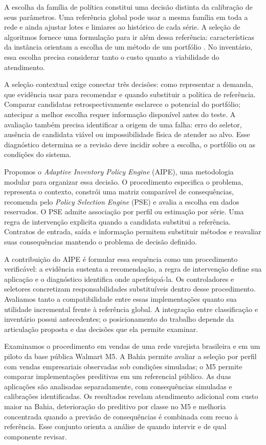 \documentclass[preprint,12pt]{elsarticle}
\begin{document}
A escolha da família de política constitui uma decisão distinta da calibração de seus parâmetros. Uma referência global pode usar a mesma família em toda a rede e ainda ajustar lotes e limiares ao histórico de cada série. A seleção de algoritmos fornece uma formulação para ir além dessa referência: características da instância orientam a escolha de um método de um portfólio \cite{rice1976,Kotthoff2014AlgorithmSelection}. No inventário, essa escolha precisa considerar tanto o custo quanto a viabilidade do atendimento.

A seleção contextual exige conectar três decisões: como representar a demanda, que evidência usar para recomendar e quando substituir a política de referência. Comparar candidatas retrospectivamente esclarece o potencial do portfólio; antecipar a melhor escolha requer informação disponível antes do teste. A avaliação também precisa identificar a origem de uma falha: erro do seletor, ausência de candidata viável ou impossibilidade física de atender ao alvo. Esse diagnóstico determina se a revisão deve incidir sobre a escolha, o portfólio ou as condições do sistema.

Propomos o \textit{Adaptive Inventory Policy Engine} (AIPE), uma metodologia modular para organizar essa decisão. O procedimento especifica o problema, representa o contexto, constrói uma matriz comparável de consequências, recomenda pelo \textit{Policy Selection Engine} (PSE) e avalia a escolha em dados reservados. O PSE admite associação por perfil ou estimação por série. Uma regra de intervenção explicita quando a candidata substitui a referência. Contratos de entrada, saída e informação permitem substituir métodos e reavaliar suas consequências mantendo o problema de decisão definido.

A contribuição do AIPE é formular essa sequência como um procedimento verificável: a evidência sustenta a recomendação, a regra de intervenção define sua aplicação e o diagnóstico identifica onde aperfeiçoá-la. Os controladores e seletores concretizam responsabilidades substituíveis dentro desse procedimento. Avaliamos tanto a compatibilidade entre essas implementações quanto sua utilidade incremental frente à referência global. A integração entre classificação e inventário possui antecedentes; o posicionamento do trabalho depende da articulação proposta e das decisões que ela permite examinar.

Examinamos o procedimento em vendas de uma rede varejista brasileira e em um piloto da base pública Walmart M5. A Bahia permite avaliar a seleção por perfil com vendas empresariais observadas sob condições simuladas; o M5 permite comparar implementações preditivas em um referencial público. As duas aplicações são analisadas separadamente, com consequências simuladas e calibrações identificadas. Os resultados revelam atendimento adicional com custo maior na Bahia, deterioração do preditivo por classe no M5 e melhoria concentrada quando a previsão de consequências é combinada com recuo à referência. Esse conjunto orienta a análise de quando intervir e de qual componente revisar.
\end{document}
